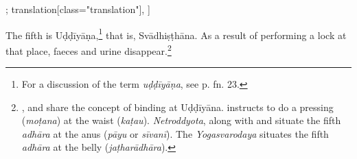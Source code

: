 \begin{alignment}[
  texts=edition[class="edition"];
  translation[class="translation"],
  ]
\begin{translation}
\begin{tlate}[p30_02]
The fifth is Uḍḍīyāṇa,\footnote{For a discussion of the term \textit{uḍḍīyāṇa}, see p.\pageref{cakra2} fn. 23.} that is, Svādhiṣṭhāna. As a result of performing a lock at that place, faeces and urine disappear.\footnote{,  and  share the concept of binding at Uḍḍīyāna.  instructs to do a pressing (\textit{moṭana}) at the waist (\textit{kaṭau}). \textit{Netroddyota}, along with  and  situate the fifth \textit{adhāra} at the anus (\textit{pāyu} or \textit{sīvanī}). The \textit{Yogasvarodaya} situates the fifth \textit{adhāra} at the belly (\textit{jaṭharādhāra}).} 
\flushpage
    \end{tlate}
  \end{translation}
\end{alignment}
\pagebreak %
